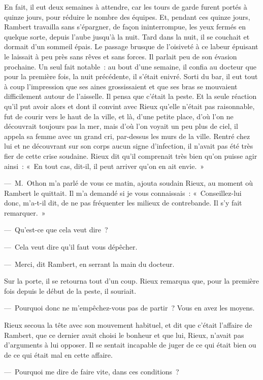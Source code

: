 \documentclass[french,twoside]{book} %
\begin{document}
En fait, il eut deux semaines à attendre, car les tours de garde furent portés à quinze jours, pour réduire le nombre des équipes. Et, pendant ces quinze jours, Rambert travailla sans s’épargner, de façon ininterrompue, les yeux fermés en quelque sorte, depuis l’aube jusqu’à la nuit. Tard dans la nuit, il se couchait et dormait d’un sommeil épais. Le passage brusque de l’oisiveté à ce labeur épuisant le laissait à peu près sans rêves et sans forces. Il parlait peu de son évasion prochaine. Un seul fait notable : au bout d’une semaine, il confia au docteur que pour la première fois, la nuit précédente, il s’était enivré. Sorti du bar, il eut tout à coup l’impression que ses aines grossissaient et que ses bras se mouvaient difficilement autour de l’aisselle. Il pensa que c’était la peste. Et la seule réaction qu’il put avoir alors et dont il convint avec Rieux qu’elle n’était pas raisonnable, fut de courir vers le haut de la ville, et là, d’une petite place, d’où l’on ne découvrait toujours pas la mer, mais d’où l’on voyait un peu plus de ciel, il appela sa femme avec un grand cri, par-dessus les murs de la ville. Rentré chez lui et ne découvrant sur son corps aucun signe d’infection, il n’avait pas été très fier de cette crise soudaine. Rieux dit qu’il comprenait très bien qu’on puisse agir ainsi : « En tout cas, dit-il, il peut arriver qu’on en ait envie. »\par
— M. Othon m’a parlé de vous ce matin, ajouta soudain Rieux, au moment où Rambert le quittait. Il m’a demandé si je vous connaissais : « Conseillez-lui donc, m’a-t-il dit, de ne pas fréquenter les milieux de contrebande. Il s’y fait remarquer. »\par
— Qu’est-ce que cela veut dire ?\par
— Cela veut dire qu’il faut vous dépêcher.\par
— Merci, dit Rambert, en serrant la main du docteur.\par
Sur la porte, il se retourna tout d’un coup. Rieux remarqua que, pour la première fois depuis le début de la peste, il souriait.\par
— Pourquoi donc ne m’empêchez-vous pas de partir ? Vous en avez les moyens.\par
Rieux secoua la tête avec son mouvement habituel, et dit que c’était l’affaire de Rambert, que ce dernier avait choisi le bonheur et que lui, Rieux, n’avait pas d’arguments à lui opposer. Il se sentait incapable de juger de ce qui était bien ou de ce qui était mal en cette affaire.\par
— Pourquoi me dire de faire vite, dans ces conditions ?\par
\end{document}
